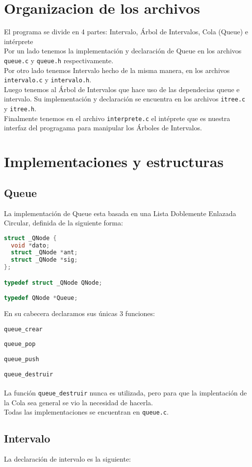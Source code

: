 \documentclass[]{article}
\begin{document}
\section{Organizacion de los archivos}
El programa se divide en 4 partes: Intervalo, Árbol de Intervalos, Cola (Queue) e intérprete\\
Por un lado tenemos la implementación y declaración de Queue en los archivos \verb|queue.c| y \verb|queue.h| respectivamente.\\
Por otro lado tenemos Intervalo hecho de la misma manera, en los archivos \verb|intervalo.c| y \verb|intervalo.h|.\\
Luego tenemos al Árbol de Intervalos que hace uso de las dependecias queue e intervalo. Su implementación y declaración se encuentra en los archivos \verb|itree.c| y \verb|itree.h|.\\
Finalmente tenemos en el archivo \verb|interprete.c| el intéprete que es nuestra interfaz del progragama para manipular los Árboles de Intervalos.
\newpage
\section{Implementaciones y estructuras}
\subsection{Queue}
La implementación de Queue esta basada en una Lista Doblemente Enlazada Circular, definida de la siguiente forma:

\begin{lstlisting}[language=C]
struct _QNode {
  void *dato;
  struct _QNode *ant;
  struct _QNode *sig;
};

typedef struct _QNode QNode;

typedef QNode *Queue;
\end{lstlisting}
En su cabecera declaramos sus únicas 3 funciones:

\verb|queue_crear|

\verb|queue_pop|

\verb|queue_push|

\verb|queue_destruir|
\\\\
La función \verb|queue_destruir| nunca es utilizada, pero para que la implentación de la Cola sea general se vio la necesidad de hacerla.\\
Todas las implementaciones se encuentran en \verb|queue.c|.
\subsection{Intervalo}
La declaración de intervalo es la siguiente:
\end{document}
